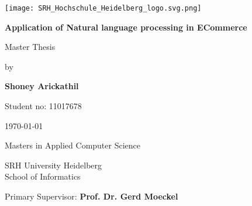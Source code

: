 \begin{titlepage}

    \vspace*{3\baselineskip}
        \begin{flushright}        
  
                \texttt{[image: SRH\_Hochschule\_Heidelberg\_logo.svg.png]}
           
        \end{flushright}
    \vspace*{3\baselineskip}

    \centering
   


    {\Large \bfseries Application of Natural language processing in ECommerce}
    \vspace*{3\baselineskip}

    {\Large Master Thesis}
    \vspace*{1\baselineskip}

    {\Large by }
    \vspace*{2\baselineskip}

    {\Large  \bfseries Shoney Arickathil }
    \vspace*{0.5\baselineskip}

    {\Large  Student no: 11017678 }
    \vspace*{2\baselineskip}

    {\Large \today}
    \vspace*{8\baselineskip}


    {\Large  Masters in Applied Computer Science }
    \vspace*{0.5\baselineskip}

    {\Large  SRH University Heidelberg \\ School of Informatics}  
    \vspace*{6\baselineskip}

    \begin{minipage}{\textwidth}
        \begin{flushleft} %
            \large Primary Supervisor: \hfill \bfseries Prof. Dr. Gerd Moeckel
           
        \end{flushleft}
       
       
    \end{minipage}

    


   
    
\end{titlepage}